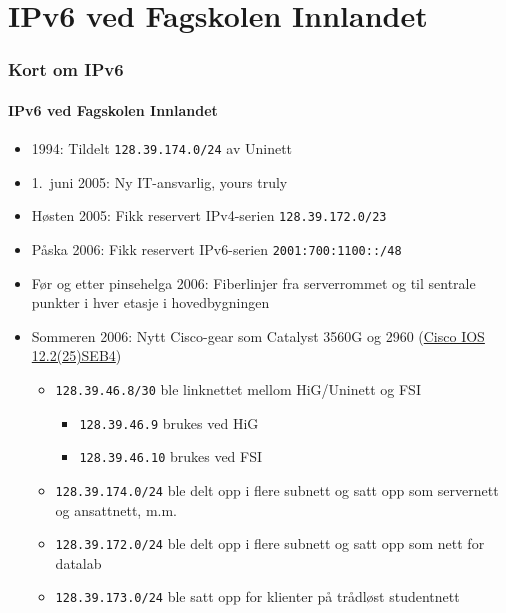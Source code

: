 \section{IPv6 ved Fagskolen Innlandet}
\begin{frame}%
  \frametitle{Kort om IPv6}
  \framesubtitle{IPv6 ved Fagskolen Innlandet}
  \pause
  \begin{itemize}[<+->]
  \item 1994: Tildelt \texttt{128.39.174.0/24} av Uninett
  \item 1.~juni 2005: Ny IT-ansvarlig, yours truly
  \item Høsten 2005: Fikk reservert IPv4-serien
    \texttt{128.39.172.0/23}
  \item Påska 2006: Fikk reservert IPv6-serien
    \texttt{2001:700:1100::/48}
  \item Før og etter pinsehelga 2006: Fiberlinjer fra serverrommet og
    til sentrale punkter i hver etasje i hovedbygningen
  \item Sommeren 2006: Nytt Cisco-gear som Catalyst 3560G og 2960
    (\href{http://www.cisco.com/en/US/docs/switches/lan/catalyst3560/software/release/12.2_25_seb/release/notes/OL7189.html}{Cisco
      IOS 12.2(25)SEB4})
    \begin{itemize}[<+->]
    \item \texttt{128.39.46.8/30} ble linknettet mellom HiG/Uninett og
      FSI
      \begin{itemize}[<+->]
      \item \texttt{128.39.46.9\phantom{0}} brukes ved HiG
      \item \texttt{128.39.46.10} brukes ved FSI
      \end{itemize}
    \item \texttt{128.39.174.0/24} ble delt opp i flere subnett og
      satt opp som servernett og ansattnett, m.m.
    \item \texttt{128.39.172.0/24} ble delt opp i flere subnett og
      satt opp som nett for datalab
    \item \texttt{128.39.173.0/24} ble satt opp for klienter på
      trådløst studentnett
    \end{itemize}
  \end{itemize}
\end{frame}


